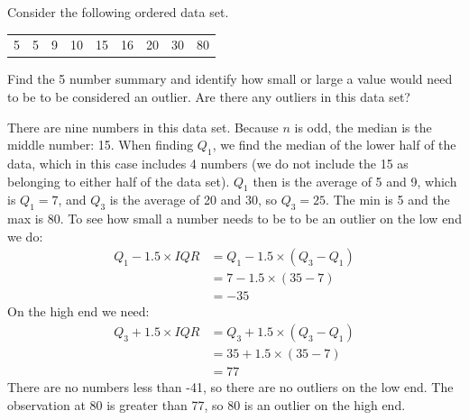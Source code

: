 \begin{example}
{Consider the following ordered data set.
\begin{center}
\begin{tabular}{ccc ccc ccc}
5 & 5 & 9 & 10 & 15 & 16 & 20 & 30 & 80 
\end{tabular}
\end{center}
Find the 5 number summary and identify how small or large a value would need to be to be considered an outlier.  Are there any outliers in this data set?}
There are nine numbers in this data set.  Because $n$ is odd, the median is the middle number: 15.  When finding $Q_1$, we find the median of the lower half of the data, which in this case includes 4 numbers (we do not include the 15 as belonging to either half of the data set).  $Q_1$ then is the average of 5 and 9, which is $Q_1 = 7$, and $Q_3$ is the average of 20 and 30, so $Q_3 = 25$.  The min is 5 and the max is 80.  To see how small a number needs to be to be an outlier on the low end we do:
\begin{align*}
Q_1 - 1.5 \times IQR
	&= Q_1 - 1.5 \times (Q_3 - Q_1) \\
	& = 7 - 1.5 \times (35 - 7) \\
	& = -35
\end{align*}
On the high end we need:
\begin{align*}
Q_3 + 1.5 \times IQR
	& = Q_3 + 1.5 \times (Q_3-Q_1) \\
	& = 35 + 1.5 \times (35 - 7) \\
	& = 77
\end{align*}
There are no numbers less than -41, so there are no outliers on the low end. The observation at 80 is greater than 77, so 80 is an outlier on the high end.
\end{example}




